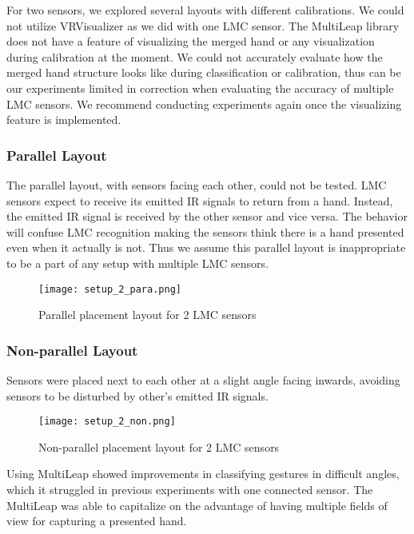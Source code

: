 For two sensors, we explored several layouts with different calibrations. We could not utilize VRVisualizer as we did with one LMC sensor. The MultiLeap library does not have a feature of visualizing the merged hand or any visualization during calibration at the moment. We could not accurately evaluate how the merged hand structure looks like during classification or calibration, thus can be our experiments limited in correction when evaluating the accuracy of multiple LMC sensors. We recommend conducting experiments again once the visualizing feature is implemented.

\subsubsection{Parallel Layout}
\label{parallel_layout}

The parallel layout, with sensors facing each other, could not be tested. LMC sensors expect to receive its emitted IR signals to return from a hand. Instead, the emitted IR signal is received by the other sensor and vice versa. The behavior will confuse LMC recognition making the sensors think there is a hand presented even when it actually is not. Thus we assume this parallel layout is inappropriate to be a part of any setup with multiple LMC sensors.

\begin{figure}[H]
    \centering
    \texttt{[image: setup\_2\_para.png]}
    \caption{Parallel placement layout for 2 LMC sensors}
    \label{fig:setup_2_para}
\end{figure}

\subsubsection{Non-parallel Layout}

Sensors were placed next to each other at a slight angle facing inwards, avoiding sensors to be disturbed by other's emitted IR signals.

\begin{figure}[ht]
    \centering
    \texttt{[image: setup\_2\_non.png]}
    \caption{Non-parallel placement layout for 2 LMC sensors}
    \label{fig:setup_2_non}
\end{figure}

Using MultiLeap \cite{tomasMultileap} showed improvements in classifying gestures in difficult angles, which it struggled in previous experiments with one connected sensor. The MultiLeap was able to capitalize on the advantage of having multiple fields of view for capturing a presented hand.

